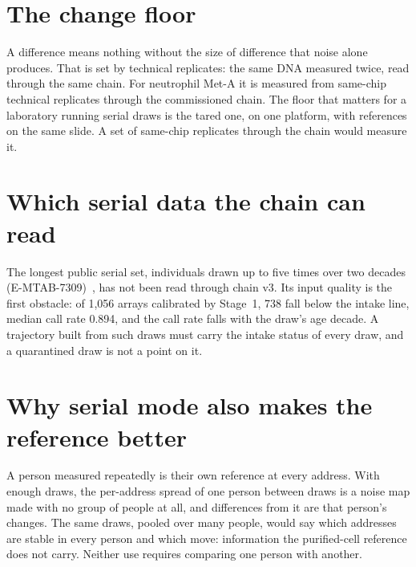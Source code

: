 \section{The change floor}

A difference means nothing without the size of difference that noise alone produces. That is set by technical replicates: the same DNA measured twice,
read through the same chain. For neutrophil Met-A it is measured from same-chip technical replicates through the commissioned chain. \openprob
The floor that matters for a laboratory running serial draws is the tared one, on one platform, with references on the same slide. A set of same-chip
replicates through the chain would measure it.

\section{Which serial data the chain can read}

The longest public serial set, individuals drawn up to five times over two decades (E-MTAB-7309)~\cite{Wang2018SATSA}, has not been read through
chain v3. Its input quality is the first obstacle: of 1,056 arrays calibrated by Stage~1, 738 fall below the intake line, median call rate 0.894,
and the call rate falls with the draw's age decade. \measured{} A trajectory built from such draws must carry the intake status of
every draw, and a quarantined draw is not a point on it. \openprob

\section{Why serial mode also makes the reference better}

A person measured repeatedly is their own reference at every address. With enough draws, the per-address spread of one person between draws is a noise map made
with no group of people at all, and differences from it are that person's changes. The same draws, pooled over many people, would say which addresses are stable in
every person and which move: information the purified-cell reference does not carry. Neither use requires comparing one person with another.
